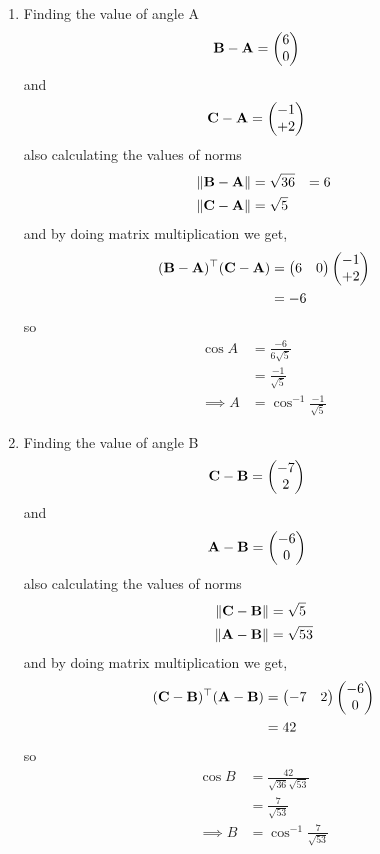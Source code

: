\documentclass[11pt]{book}
\begin{document}
\begin{enumerate}[label=\thesection.\arabic*.,ref=\thesection.\theenumi]
\begin{enumerate}
\item Finding the value of angle A
\begin{align}
	\mathbf{B}-\mathbf{A} &=\begin{pmatrix}6\\0\end{pmatrix}
\end{align}
and 
\begin{align}
	\mathbf{C}-\mathbf{A}&= \begin{pmatrix}-1\\+2\end{pmatrix}
\end{align}
also calculating the values of norms
\begin{align}
	\left\lVert\mathbf{B}-\mathbf{A}\right\rVert &= \sqrt{36} &= 6\\
	\left\lVert\mathbf{C}-\mathbf{A}\right\rVert &= \sqrt{5}
\end{align}
and by doing matrix multiplication we get,
\begin{align}
\begin{split}
	(\mathbf{B}-\mathbf{A})^{\top}(\mathbf{C}-\mathbf{A})&=\begin{pmatrix}6&0\end{pmatrix}\begin{pmatrix}-1\\+2\end{pmatrix}\\
	&=-6
\end{split}
\end{align}
so 
\begin{align}
	\cos{A}&= \frac{-6}{6 \sqrt{5}}\\
	&= \frac{-1}{\sqrt{5}}\\
	\implies A&=\cos^{-1}{\frac{-1}{\sqrt{5}}}
\end{align}




\item Finding the value of angle B
\begin{align}
	\mathbf{C}-\mathbf{B} &=\begin{pmatrix}-7\\2\end{pmatrix}
\end{align}
and 
\begin{align}
	\mathbf{A}-\mathbf{B}&= \begin{pmatrix}-6\\0\end{pmatrix}
\end{align}
also calculating the values of norms
\begin{align}
	\left\lVert\mathbf{C}-\mathbf{B}\right\rVert &= \sqrt{5}\\
	\left\lVert\mathbf{A}-\mathbf{B}\right\rVert &= \sqrt{53}
\end{align}
and by doing matrix multiplication we get,
\begin{align}
\begin{split}
	(\mathbf{C}-\mathbf{B})^{\top}(\mathbf{A}-\mathbf{B})&=\begin{pmatrix}-7&2\end{pmatrix}\begin{pmatrix}-6\\0\end{pmatrix}\\
	&= 42
\end{split}
\end{align}
so 
\begin{align}
	\cos{B}&= \frac{42}{\sqrt{36} \sqrt{53}}\\
	&= \frac{7}{\sqrt{53}}\\
	\implies B&=\cos^{-1}{\frac{7}{\sqrt{53}}}
\end{align}




\end{enumerate}
\end{enumerate}
\end{document}
